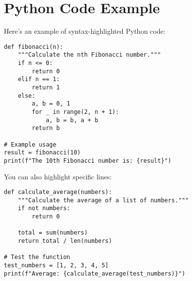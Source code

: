 \documentclass{article}
\begin{document}
\section{Python Code Example}

Here's an example of syntax-highlighted Python code:

\begin{verbatim}
def fibonacci(n):
    """Calculate the nth Fibonacci number."""
    if n <= 0:
        return 0
    elif n == 1:
        return 1
    else:
        a, b = 0, 1
        for _ in range(2, n + 1):
            a, b = b, a + b
        return b

# Example usage
result = fibonacci(10)
print(f"The 10th Fibonacci number is: {result}")
\end{verbatim}

You can also highlight specific lines:

\begin{verbatim}
def calculate_average(numbers):
    """Calculate the average of a list of numbers."""
    if not numbers:
        return 0

    total = sum(numbers)
    return total / len(numbers)

# Test the function
test_numbers = [1, 2, 3, 4, 5]
print(f"Average: {calculate_average(test_numbers)}")
\end{verbatim}
\end{document}
